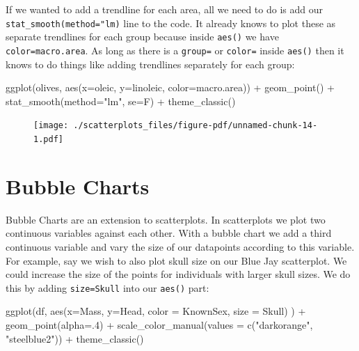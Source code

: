 \documentclass[
  letterpaper,
  DIV=11,
  numbers=noendperiod]{scrreprt}
\newenvironment{Shaded}{\begin{snugshade}}{\end{snugshade}}
\newcommand{\AttributeTok}[1]{\textcolor[rgb]{0.40,0.45,0.13}{#1}}
\newcommand{\DecValTok}[1]{\textcolor[rgb]{0.68,0.00,0.00}{#1}}
\newcommand{\FunctionTok}[1]{\textcolor[rgb]{0.28,0.35,0.67}{#1}}
\newcommand{\NormalTok}[1]{\textcolor[rgb]{0.00,0.23,0.31}{#1}}
\newcommand{\SpecialCharTok}[1]{\textcolor[rgb]{0.37,0.37,0.37}{#1}}
\newcommand{\StringTok}[1]{\textcolor[rgb]{0.13,0.47,0.30}{#1}}
\begin{document}
If we wanted to add a trendline for each area, all we need to do is add
our \texttt{stat\_smooth(method="lm)} line to the code. It already knows
to plot these as separate trendlines for each group because inside
\texttt{aes()} we have \texttt{color=macro.area}. As long as there is a
\texttt{group=} or \texttt{color=} inside \texttt{aes()} then it knows
to do things like adding trendlines separately for each group:

\begin{Shaded}
\begin{Highlighting}[]
\FunctionTok{ggplot}\NormalTok{(olives, }\FunctionTok{aes}\NormalTok{(}\AttributeTok{x=}\NormalTok{oleic, }\AttributeTok{y=}\NormalTok{linoleic, }\AttributeTok{color=}\NormalTok{macro.area)) }\SpecialCharTok{+}
  \FunctionTok{geom\_point}\NormalTok{() }\SpecialCharTok{+}
  \FunctionTok{stat\_smooth}\NormalTok{(}\AttributeTok{method=}\StringTok{"lm"}\NormalTok{, }\AttributeTok{se=}\NormalTok{F) }\SpecialCharTok{+}
  \FunctionTok{theme\_classic}\NormalTok{() }
\end{Highlighting}
\end{Shaded}

\begin{figure}[H]

{\centering \texttt{[image: ./scatterplots\_files/figure-pdf/unnamed-chunk-14-1.pdf]}

}

\end{figure}

\hypertarget{bubble-charts}{%
\section{Bubble Charts}\label{bubble-charts}}

Bubble Charts are an extension to scatterplots. In scatterplots we plot
two continuous variables against each other. With a bubble chart we add
a third continuous variable and vary the size of our datapoints
according to this variable. For example, say we wish to also plot skull
size on our Blue Jay scatterplot. We could increase the size of the
points for individuals with larger skull sizes. We do this by adding
\texttt{size=Skull} into our \texttt{aes()} part:

\begin{Shaded}
\begin{Highlighting}[]
\FunctionTok{ggplot}\NormalTok{(df, }\FunctionTok{aes}\NormalTok{(}\AttributeTok{x=}\NormalTok{Mass, }\AttributeTok{y=}\NormalTok{Head, }\AttributeTok{color =}\NormalTok{ KnownSex, }\AttributeTok{size =}\NormalTok{ Skull) ) }\SpecialCharTok{+} 
  \FunctionTok{geom\_point}\NormalTok{(}\AttributeTok{alpha=}\NormalTok{.}\DecValTok{4}\NormalTok{) }\SpecialCharTok{+}
  \FunctionTok{scale\_color\_manual}\NormalTok{(}\AttributeTok{values =} \FunctionTok{c}\NormalTok{(}\StringTok{"darkorange"}\NormalTok{, }\StringTok{"steelblue2"}\NormalTok{)) }\SpecialCharTok{+}
  \FunctionTok{theme\_classic}\NormalTok{()}
\end{Highlighting}
\end{Shaded}
\end{document}
